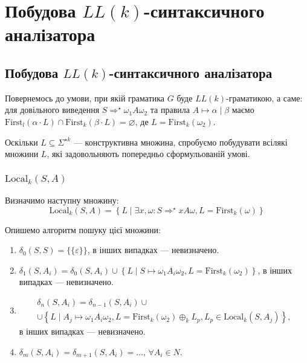 \setcounter{section}{11}

\section{Побудова $LL(k)$-синтаксичного аналізатора}

\subsection{Побудова $LL(k)$-синтаксичного аналізатора}

Повернемось до умови, при якій граматика $G$ буде $LL(k)$-граматикою, а саме: для довільного виведення $S \Rightarrow^\star \omega_1 A \omega_2$ та правила $A \mapsto \alpha \mid \beta$ маємо $\text{First}_l(\alpha \cdot L) \cap \text{First}_k(\beta \cdot L) = \varnothing$, де $L = \text{First}_k(\omega_2)$. \medskip

Оскільки $L \subseteq \Sigma^{\star k}$ --- конструктивна множина, спробуємо побудувати всілякі множини $L$, які задовольняють попередньо сформульованій умові.

\subsubsection{$\text{Local}_k(S, A)$}

Визначимо наступну множину:
\[\text{Local}_k(S, A) = \left\{ L \mid \exists x, \omega: S \Rightarrow^\star xA\omega, L = \text{First}_k(\omega) \right\}\]

Опишемо алгоритм пошуку цієї множини:
\begin{enumerate}
\item $\delta_0(S, S) = \{\{\varepsilon\}\}$, в інших випадках --- невизначено.
\item $\delta_1(S, A_i) = \delta_0(S, A_i) \cup \left\{ L \mid S \mapsto \omega_1 A_i \omega_2, L = \text{First}_k (\omega_2) \right\}$, в інших випадках --- невизначено.
\item 
\begin{multline*}
	\delta_n(S, A_i) = \delta_{n - 1}(S, A_i) \cup \\
	\cup \left\{ L \mid A_j \mapsto \omega_1 A_i \omega_2, L = \text{First}_k (\omega_2) \oplus_k L_p, L_p \in \text{Local}_k(S, A_j) \right\},
\end{multline*}
в інших випадках --- невизначено.
\item $\delta_m(S, A_i) = \delta_{m + 1}(S, A_i) = \ldots$, $\forall A_i \in N$.
\end{enumerate}

